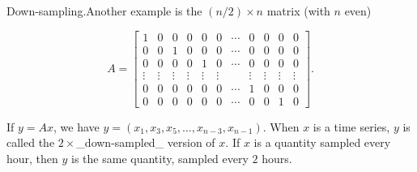 Down-sampling.Another example is the \((n/2)\times n\) matrix (with \(n\) even)

\[A=\left[\begin{array}{cccccccccc}1&0&0&0&0&0&\cdots&0&0&0&0\\ 0&0&1&0&0&0&\cdots&0&0&0&0\\ 0&0&0&0&1&0&\cdots&0&0&0&0\\ \vdots&\vdots&\vdots&\vdots&\vdots&\vdots&&\vdots&\vdots&\vdots&\vdots\\ 0&0&0&0&0&0&\cdots&1&0&0&0\\ 0&0&0&0&0&0&\cdots&0&0&1&0\end{array}\right].\]

If \(y=Ax\), we have \(y=(x_{1},x_{3},x_{5},\ldots,x_{n-3},x_{n-1})\). When \(x\) is a time series, \(y\) is called the \(2\times\)_down-sampled_ version of \(x\). If \(x\) is a quantity sampled every hour, then \(y\) is the same quantity, sampled every \(2\) hours.

 